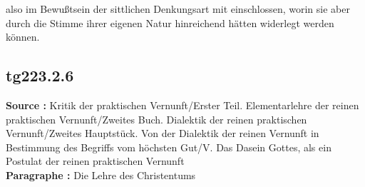 \documentclass[a4paper,12pt,twoside]{book}
\begin{document}
also im Bewußtsein der sittlichen Denkungsart mit einschlossen, worin sie aber durch die Stimme ihrer eigenen Natur hinreichend hätten widerlegt werden können. 
	
	\subsection*{tg223.2.6} 
	\textbf{Source : }Kritik der praktischen Vernunft/Erster Teil. Elementarlehre der reinen praktischen Vernunft/Zweites Buch. Dialektik der reinen praktischen Vernunft/Zweites Hauptstück. Von der Dialektik der reinen Vernunft in Bestimmung des Begriffs vom höchsten Gut/V. Das Dasein Gottes, als ein Postulat der reinen praktischen Vernunft\\  
	
	\textbf{Paragraphe : }Die Lehre des Christentums
	
\end{document}
